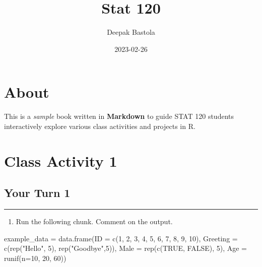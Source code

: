 \documentclass[
]{book}
\title{Stat 120}
\author{Deepak Bastola}
\date{2023-02-26}
\newenvironment{Shaded}{\begin{snugshade}}{\end{snugshade}}
\newcommand{\AttributeTok}[1]{\textcolor[rgb]{0.77,0.63,0.00}{#1}}
\newcommand{\ConstantTok}[1]{\textcolor[rgb]{0.00,0.00,0.00}{#1}}
\newcommand{\DecValTok}[1]{\textcolor[rgb]{0.00,0.00,0.81}{#1}}
\newcommand{\FunctionTok}[1]{\textcolor[rgb]{0.00,0.00,0.00}{#1}}
\newcommand{\NormalTok}[1]{#1}
\newcommand{\OtherTok}[1]{\textcolor[rgb]{0.56,0.35,0.01}{#1}}
\newcommand{\StringTok}[1]{\textcolor[rgb]{0.31,0.60,0.02}{#1}}
\providecommand{\tightlist}{%
  \setlength{\itemsep}{0pt}\setlength{\parskip}{0pt}}
\begin{document}
\maketitle

{
\setcounter{tocdepth}{1}
\tableofcontents
}
\hypertarget{about}{%
\chapter*{About}\label{about}}

This is a \emph{sample} book written in \textbf{Markdown} to guide STAT 120 students interactively explore various class activities and projects in R.

\hypertarget{class-activity-1}{%
\chapter{Class Activity 1}\label{class-activity-1}}

\hypertarget{your-turn-1}{%
\section{Your Turn 1}\label{your-turn-1}}

\begin{center}\rule{0.5\linewidth}{0.5pt}\end{center}

\begin{enumerate}
\def\labelenumi{\alph{enumi}.}
\tightlist
\item
  Run the following chunk. Comment on the output.
\end{enumerate}

\begin{Shaded}
\begin{Highlighting}[]
\NormalTok{example\_data }\OtherTok{=} \FunctionTok{data.frame}\NormalTok{(}\AttributeTok{ID =} \FunctionTok{c}\NormalTok{(}\DecValTok{1}\NormalTok{, }\DecValTok{2}\NormalTok{, }\DecValTok{3}\NormalTok{, }\DecValTok{4}\NormalTok{, }\DecValTok{5}\NormalTok{, }\DecValTok{6}\NormalTok{, }\DecValTok{7}\NormalTok{, }\DecValTok{8}\NormalTok{, }\DecValTok{9}\NormalTok{, }\DecValTok{10}\NormalTok{),}
                          \AttributeTok{Greeting =} \FunctionTok{c}\NormalTok{(}\FunctionTok{rep}\NormalTok{(}\StringTok{"Hello"}\NormalTok{, }\DecValTok{5}\NormalTok{), }\FunctionTok{rep}\NormalTok{(}\StringTok{"Goodbye"}\NormalTok{,}\DecValTok{5}\NormalTok{)),}
                          \AttributeTok{Male =} \FunctionTok{rep}\NormalTok{(}\FunctionTok{c}\NormalTok{(}\ConstantTok{TRUE}\NormalTok{, }\ConstantTok{FALSE}\NormalTok{), }\DecValTok{5}\NormalTok{),}
                          \AttributeTok{Age =} \FunctionTok{runif}\NormalTok{(}\AttributeTok{n=}\DecValTok{10}\NormalTok{, }\DecValTok{20}\NormalTok{, }\DecValTok{60}\NormalTok{))}
\end{Highlighting}
\end{Shaded}
\end{document}
